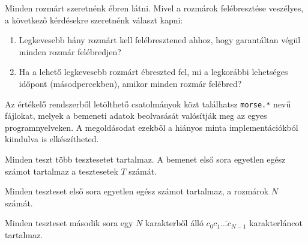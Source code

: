Minden rozmárt szeretnénk ébren látni. Mivel a rozmárok felébresztése veszélyes, a következő kérdésekre szeretnénk választ kapni:
\begin{enumerate}
\item Legkevesebb hány rozmárt kell felébresztened ahhoz, hogy garantáltan végül minden rozmár felébredjen?
\item Ha a lehető legkevesebb rozmárt ébreszted fel, mi a legkorábbi lehetséges időpont (másodpercekben), amikor minden rozmár felébred?
\end{enumerate}

\begin{warning}
Az értékelő rendszerből letölthető csatolmányok közt találhatsz
\texttt{morse.*} nevű fájlokat, melyek a bemeneti adatok beolvasását valósítják meg az egyes programnyelveken.
A megoldásodat ezekből a hiányos minta implementációkból kiindulva is elkészítheted.
\end{warning}

\InputFile

Minden teszt több tesztesetet tartalmaz. A bemenet első sora egyetlen egész számot tartalmaz a tesztesetek $T$ számát.

Minden teszteset első sora egyetlen egész számot tartalmaz, a rozmárok $N$ számát.

Minden teszteset második sora egy $N$ karakterből álló $\overline{c_0c_1\ldots c_{N-1}}$ karakterláncot tartalmaz.


\OutputFile

